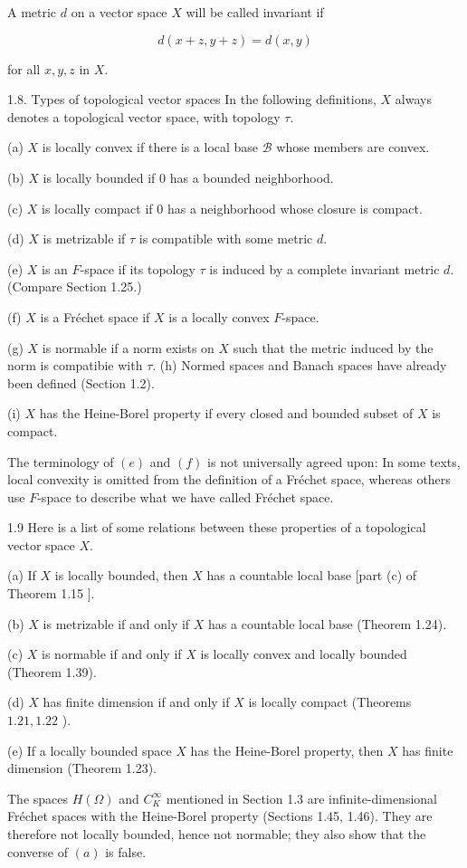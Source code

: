\documentclass[10pt]{article}
\begin{document}
A metric $d$ on a vector space $X$ will be called invariant if

$$
d(x+z, y+z)=d(x, y)
$$

for all $x, y, z$ in $X$.

1.8. Types of topological vector spaces In the following definitions, $X$ always denotes a topological vector space, with topology $\tau$.

(a) $X$ is locally convex if there is a local base $\mathscr{B}$ whose members are convex.

(b) $X$ is locally bounded if 0 has a bounded neighborhood.

(c) $X$ is locally compact if 0 has a neighborhood whose closure is compact.

(d) $X$ is metrizable if $\tau$ is compatible with some metric $d$.

(e) $X$ is an $F$-space if its topology $\tau$ is induced by a complete invariant metric $d$. (Compare Section 1.25.)

(f) $X$ is a Fréchet space if $X$ is a locally convex $F$-space.

(g) $X$ is normable if a norm exists on $X$ such that the metric induced by the norm is compatibie with $\tau$.
(h) Normed spaces and Banach spaces have already been defined (Section 1.2).

(i) $X$ has the Heine-Borel property if every closed and bounded subset of $X$ is compact.

The terminology of $(e)$ and $(f)$ is not universally agreed upon: In some texts, local convexity is omitted from the definition of a Fréchet space, whereas others use $F$-space to describe what we have called Fréchet space.

1.9 Here is a list of some relations between these properties of a topological vector space $X$.

(a) If $X$ is locally bounded, then $X$ has a countable local base [part (c) of Theorem 1.15 ].

(b) $X$ is metrizable if and only if $X$ has a countable local base (Theorem 1.24).

(c) $X$ is normable if and only if $X$ is locally convex and locally bounded (Theorem 1.39).

(d) $X$ has finite dimension if and only if $X$ is locally compact (Theorems $1.21,1.22$ ).

(e) If a locally bounded space $X$ has the Heine-Borel property, then $X$ has finite dimension (Theorem 1.23).

The spaces $H(\Omega)$ and $C_{K}^{\infty}$ mentioned in Section 1.3 are infinite-dimensional Fréchet spaces with the Heine-Borel property (Sections 1.45, 1.46). They are therefore not locally bounded, hence not normable; they also show that the converse of $(a)$ is false.
\end{document}
